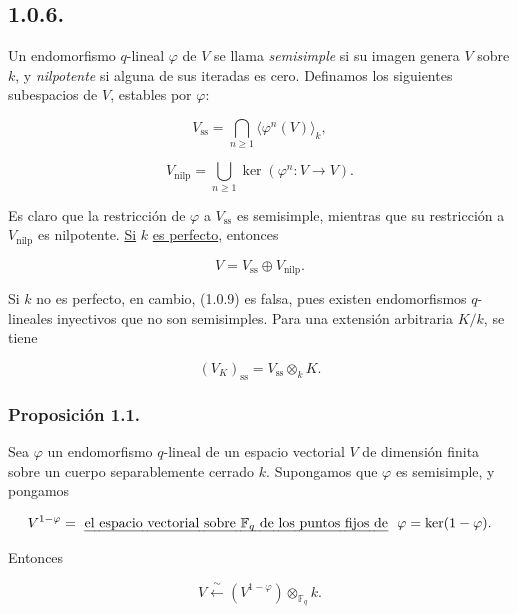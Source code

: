 \pageoriginale

\subsection*{1.0.6.}
Un endomorfismo $q$-lineal $\varphi$ de $V$ se llama \emph{semisimple} si
su imagen genera $V$ sobre $k$, y \emph{nilpotente} si alguna de sus
iteradas es cero. Definamos los siguientes subespacios de $V$, estables por
$\varphi$:

\begin{equation}\tag{1.0.7}
V_{\mathrm{ss}}=
\bigcap_{n\geq1}\langle\varphi^n(V)\rangle_k,
\end{equation}

\begin{equation}\tag{1.0.8}
V_{\mathrm{nilp}}=
\bigcup_{n\geq1}\ker(\varphi^n:V\longrightarrow V).
\end{equation}

Es claro que la restricción de $\varphi$ a $V_{\mathrm{ss}}$ es
semisimple, mientras que su restricción a $V_{\mathrm{nilp}}$ es
nilpotente. \underline{Si} $k$ \underline{es perfecto}, entonces

\begin{equation}\tag{1.0.9}
V=V_{\mathrm{ss}}\oplus V_{\mathrm{nilp}}.
\end{equation}

Si $k$ no es perfecto, en cambio, (1.0.9) es falsa, pues existen
endomorfismos $q$-lineales inyectivos que no son semisimples. Para una
extensión arbitraria $K/k$, se tiene

\begin{equation}\tag{1.0.10}
(V_K)_{\mathrm{ss}}=V_{\mathrm{ss}}\otimes_kK.
\end{equation}

\subsubsection*{Proposición 1.1.}
Sea $\varphi$ un endomorfismo $q$-lineal de un espacio vectorial $V$ de
dimensión finita sobre un cuerpo separablemente cerrado $k$. Supongamos que
$\varphi$ es semisimple, y pongamos

\[
V^{1-\varphi}
=\text{\underline{el espacio vectorial sobre $\mathbb F_q$ de los puntos fijos de}
$\varphi$}
=\ker(1-\varphi).
\]

Entonces

\begin{equation}\tag{1.1.1}
V\xleftarrow{\ \sim\ }
(V^{1-\varphi})\otimes_{\mathbb F_q}k.
\end{equation}

